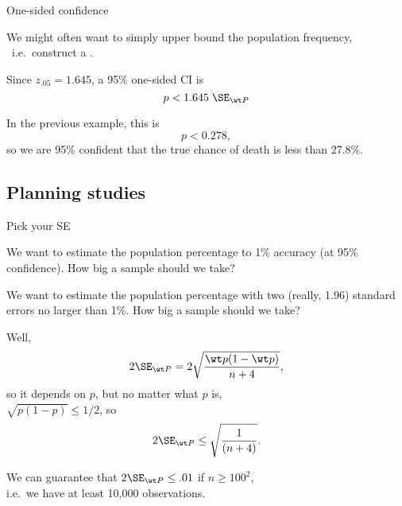 \begin{frame}{One-sided confidence}

    We might often want to simply \alert{upper bound} the population frequency,\\\
    i.e.\ construct a .

    \vspace{2em}

    Since $z_{.05} = 1.645$, 
    a \alert{95\% one-sided CI} is 
        \[ p < 1.645 \; \SE_{\wt P} \]

    \vspace{2em}

    In the previous example, this is
        \[ p < 0.278 , \]
    so we are 95\% confident that the true chance of death is less than 27.8\%.


\end{frame}

\subsection{Planning studies}

\begin{frame}{Pick your SE}

    We want to estimate the population percentage to \alert{1\% accuracy}
    (at 95\% confidence).
    How big a sample should we take?

    \vspace{2em}
    \pause

     We want to estimate the population percentage
    with two {\tiny (really, 1.96)} standard errors no larger than 1\%.
    How big a sample should we take?

    \vspace{2em}

    Well,
        \[ 2 \SE_{\wt P} = 2 \sqrt{\frac{\wt p (1-\wt p)}{n+4} } ,\]
        so it \alert<1>{depends on $p$}, \pause but \alert<2>{no matter what $p$ is,}\\
    $\sqrt{p (1-p)} \le 1/2$,
    so
    \[ 2 \SE_{\wt P} \le \sqrt{\frac{1}{(n+4)} } .\]

    \vspace{1em}

    We can guarantee that $2 \SE_{\wt P} \le .01$ if $n \ge 100^2$, \\
    i.e.\ we have at least 10,000 observations.


\end{frame}

